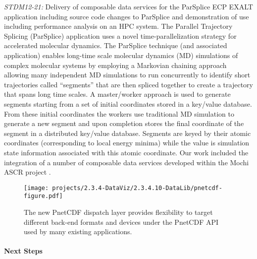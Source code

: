 \emph{STDM12-21:}
Delivery of composable data services for the ParSplice ECP EXALT
application including source code changes to ParSplice and demonstration
 of use including performance analysis on an HPC system.   The
Parallel Trajectory Splicing (ParSplice) application uses a novel
time-parallelization strategy for accelerated molecular dynamics. The
ParSplice technique (and associated application) enables long-time
scale molecular dynamics (MD) simulations of complex molecular systems
by employing a Markovian chaining approach allowing many independent MD
simulations to run concurrently to identify short trajectories called
“segments” that are then spliced together to create a trajectory
that spans long time scales. A master/worker approach is used to generate
segments starting from a set of initial coordinates stored in a key/value
database. From these initial coordinates the workers use traditional MD
simulation to generate a new segment and upon completion stores the final
coordinate of the segment in a distributed key/value database. Segments
are keyed by their atomic coordinates (corresponding to local energy
minima) while the value is simulation state information associated with
this atomic coordinate.  Our work included the integration of a number
of composable data services developed within the Mochi ASCR project .

\begin{figure}[htb]
        \centering
        \texttt{[image: projects/2.3.4-DataViz/2.3.4.10-DataLib/pnetcdf-figure.pdf]}
        \caption{\label{fig:pnetcdf} The new PnetCDF dispatch layer provides flexibility to target different back-end formats and devices under the PnetCDF API used by many existing applications.
        }
\end{figure}

\paragraph{Next Steps}

